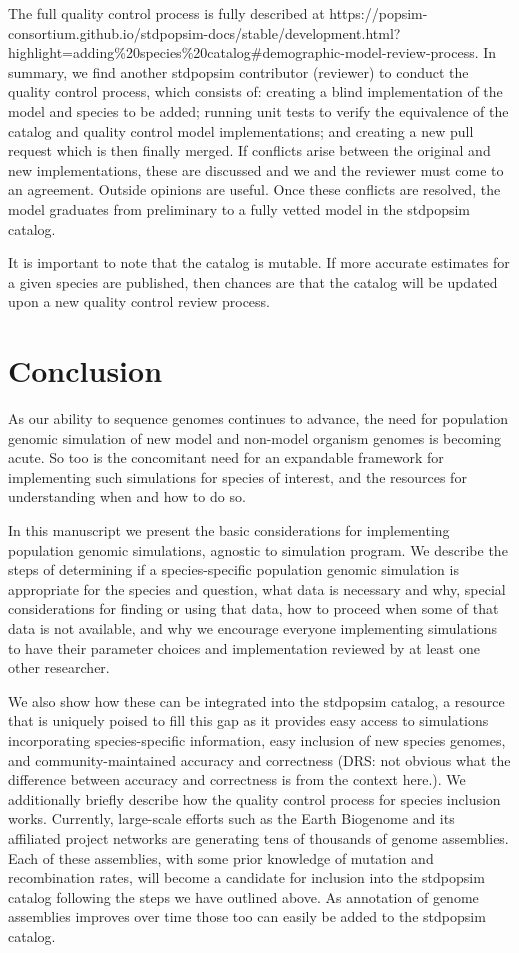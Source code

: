 \documentclass[hidelinks]{article}
\begin{document}
The full quality control process is fully described at
https://popsim-consortium.github.io/stdpopsim-docs/stable/development.html?highlight=adding\%20species\%20catalog\#demographic-model-review-process.
In summary, we find another stdpopsim contributor (reviewer) to conduct
the quality control process, which consists of: creating a blind
implementation of the model and species to be added; running unit tests
to verify the equivalence of the catalog and quality control model
implementations; and creating a new pull request which is then finally
merged. If conflicts arise between the original and new implementations,
these are discussed and we and the reviewer must come to an agreement.
Outside opinions are useful. Once these conflicts are resolved, the
model graduates from preliminary to a fully vetted model in the stdpopsim catalog.

It is important to note that the catalog is mutable. If more accurate
estimates for a given species are published, then chances are that the
catalog will be updated upon a new quality control review process.

\hypertarget{conclusion}{%
\section*{Conclusion}\label{conclusion}}

As our ability to sequence genomes continues to advance, the need for
population genomic simulation of new model and non-model organism genomes is
becoming acute. So too is the concomitant need for an expandable framework
for implementing such simulations for species of interest, and
the resources for understanding when and how to do so.

In this manuscript we present the basic considerations for implementing
population genomic simulations, agnostic to simulation program. We
describe the steps of determining if a species-specific population
genomic simulation is appropriate for the species and question, what
data is necessary and why, special considerations for finding or using
that data, how to proceed when some of that data is not available,
and why we encourage everyone implementing simulations to have their
parameter choices and implementation reviewed by at least one other
researcher.

We also show how these can be integrated into the stdpopsim catalog, a
resource that is uniquely poised to fill this gap as it provides easy
access to simulations incorporating species-specific information,
easy inclusion of new species genomes, and community-maintained accuracy
and correctness (DRS: not obvious what the difference between accuracy
and correctness is from the context here.).
We additionally briefly describe how the quality control 
process for species inclusion works. Currently, large-scale efforts such as the Earth Biogenome
and its affiliated project networks are generating tens of thousands of genome
assemblies. Each of these assemblies, with some prior knowledge of mutation and
recombination rates, will become a candidate for inclusion into the
stdpopsim catalog following the steps we have outlined above. As
annotation of genome assemblies improves over time those too can easily
be added to the stdpopsim catalog.
\end{document}
